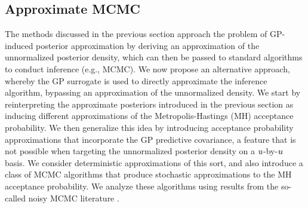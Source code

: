 \documentclass[12pt]{article}
\begin{document}
\subsection{Approximate MCMC} \label{post_approx_mcmc}
The methods discussed in the previous section approach the problem of GP-induced posterior approximation 
by deriving an approximation of the unnormalized posterior density, which can then be passed to standard 
algorithms to conduct inference (e.g., MCMC). We now propose an alternative approach, whereby the 
GP surrogate is used to directly approximate the inference algorithm, bypassing an approximation of the 
unnormalized density. We start by reinterpreting the approximate posteriors introduced in the previous section 
as inducing different approximations of the Metropolis-Hastings (MH) acceptance probability. 
We then generalize this idea by introducing acceptance probability approximations that incorporate the 
GP predictive covariance, a feature that is not possible when targeting the unnormalized posterior 
density on a $u$-by-$u$ basis. We consider deterministic approximations of this sort, and also introduce
a class of MCMC algorithms that produce stochastic approximations to the MH acceptance probability. 
We analyze these algorithms using results from the so-called noisy MCMC literature 
\citep{noisyMCMC, stabilityNoisyMH, noisyMCSurvey, pseudoMarginalMCMC}.
\end{document}
